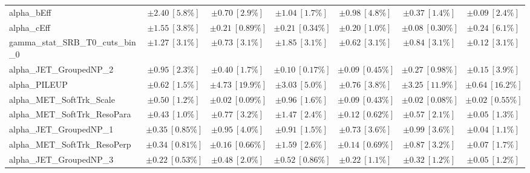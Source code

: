 \begin{sidewaystable}
\begin{center}
\begin{tabular*}{\textwidth}{@{\extracolsep{\fill}}lcccccc}
alpha\_bEff         & $\pm 2.40\ [5.8\%] $          & $\pm 0.70\ [2.9\%] $          & $\pm 1.04\ [1.7\%] $          & $\pm 0.98\ [4.8\%] $          & $\pm 0.37\ [1.4\%] $          & $\pm 0.09\ [2.4\%] $       \\
alpha\_cEff         & $\pm 1.55\ [3.8\%] $          & $\pm 0.21\ [0.89\%] $          & $\pm 0.21\ [0.34\%] $          & $\pm 0.20\ [1.0\%] $          & $\pm 0.08\ [0.30\%] $          & $\pm 0.24\ [6.1\%] $       \\
gamma\_stat\_SRB\_T0\_cuts\_bin\_0         & $\pm 1.27\ [3.1\%] $          & $\pm 0.73\ [3.1\%] $          & $\pm 1.85\ [3.1\%] $          & $\pm 0.62\ [3.1\%] $          & $\pm 0.84\ [3.1\%] $          & $\pm 0.12\ [3.1\%] $       \\
alpha\_JET\_GroupedNP\_2         & $\pm 0.95\ [2.3\%] $          & $\pm 0.40\ [1.7\%] $          & $\pm 0.10\ [0.17\%] $          & $\pm 0.09\ [0.45\%] $          & $\pm 0.27\ [0.98\%] $          & $\pm 0.15\ [3.9\%] $       \\
alpha\_PILEUP         & $\pm 0.62\ [1.5\%] $          & $\pm 4.73\ [19.9\%] $          & $\pm 3.03\ [5.0\%] $          & $\pm 0.76\ [3.8\%] $          & $\pm 3.25\ [11.9\%] $          & $\pm 0.64\ [16.2\%] $       \\
alpha\_MET\_SoftTrk\_Scale         & $\pm 0.50\ [1.2\%] $          & $\pm 0.02\ [0.09\%] $          & $\pm 0.96\ [1.6\%] $          & $\pm 0.09\ [0.43\%] $          & $\pm 0.02\ [0.08\%] $          & $\pm 0.02\ [0.55\%] $       \\
alpha\_MET\_SoftTrk\_ResoPara         & $\pm 0.43\ [1.0\%] $          & $\pm 0.77\ [3.2\%] $          & $\pm 1.47\ [2.4\%] $          & $\pm 0.12\ [0.62\%] $          & $\pm 0.57\ [2.1\%] $          & $\pm 0.05\ [1.3\%] $       \\
alpha\_JET\_GroupedNP\_1         & $\pm 0.35\ [0.85\%] $          & $\pm 0.95\ [4.0\%] $          & $\pm 0.91\ [1.5\%] $          & $\pm 0.73\ [3.6\%] $          & $\pm 0.99\ [3.6\%] $          & $\pm 0.04\ [1.1\%] $       \\
alpha\_MET\_SoftTrk\_ResoPerp         & $\pm 0.34\ [0.81\%] $          & $\pm 0.16\ [0.66\%] $          & $\pm 1.59\ [2.6\%] $          & $\pm 0.14\ [0.69\%] $          & $\pm 0.87\ [3.2\%] $          & $\pm 0.07\ [1.7\%] $       \\
alpha\_JET\_GroupedNP\_3         & $\pm 0.22\ [0.53\%] $          & $\pm 0.48\ [2.0\%] $          & $\pm 0.52\ [0.86\%] $          & $\pm 0.22\ [1.1\%] $          & $\pm 0.32\ [1.2\%] $          & $\pm 0.05\ [1.2\%] $       \\

\end{tabular*}
\end{center}
\end{sidewaystable}
